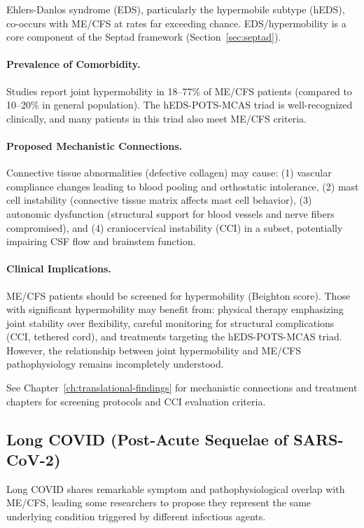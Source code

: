 Ehlers-Danlos syndrome (EDS), particularly the hypermobile subtype (hEDS), co-occurs with ME/CFS at rates far exceeding chance. EDS/hypermobility is a core component of the Septad framework (Section~\ref{sec:septad}).

\paragraph{Prevalence of Comorbidity.}
Studies report joint hypermobility in 18--77\% of ME/CFS patients (compared to 10--20\% in general population). The hEDS-POTS-MCAS triad is well-recognized clinically, and many patients in this triad also meet ME/CFS criteria.

\paragraph{Proposed Mechanistic Connections.}
Connective tissue abnormalities (defective collagen) may cause: (1) vascular compliance changes leading to blood pooling and orthostatic intolerance, (2) mast cell instability (connective tissue matrix affects mast cell behavior), (3) autonomic dysfunction (structural support for blood vessels and nerve fibers compromised), and (4) craniocervical instability (CCI) in a subset, potentially impairing CSF flow and brainstem function.

\paragraph{Clinical Implications.}
ME/CFS patients should be screened for hypermobility (Beighton score). Those with significant hypermobility may benefit from: physical therapy emphasizing joint stability over flexibility, careful monitoring for structural complications (CCI, tethered cord), and treatments targeting the hEDS-POTS-MCAS triad. However, the relationship between joint hypermobility and ME/CFS pathophysiology remains incompletely understood.

See Chapter~\ref{ch:translational-findings} for mechanistic connections and treatment chapters for screening protocols and CCI evaluation criteria.

\subsection{Long COVID (Post-Acute Sequelae of SARS-CoV-2)}

Long COVID shares remarkable symptom and pathophysiological overlap with ME/CFS, leading some researchers to propose they represent the same underlying condition triggered by different infectious agents.

